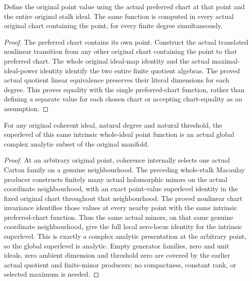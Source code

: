 \begin{theorem}
\label{hir:actual-intrinsic-whole-stalk-hilbert-samuel-value}
\leanok
{}
Define the original point value using the actual preferred chart at that
point and the entire original stalk ideal. The same function is computed
in every actual original chart containing the point, for every finite
degree simultaneously.
\end{theorem}
\begin{proof}
The preferred chart contains its own point. Construct the actual translated
nonlinear transition from any other original chart containing the point
to that preferred chart. The whole original ideal-map identity and the
actual maximal-ideal-power identity identify the two entire finite quotient
algebras. The proved actual quotient linear equivalence preserves their
literal dimensions for each degree. This proves equality with the single
preferred-chart function, rather than defining a separate value for each
chosen chart or accepting chart-equality as an assumption.
\end{proof}

\begin{theorem}
\label{hir:actual-intrinsic-hilbert-samuel-analytic-superlevels}
\leanok
{}
For any original coherent ideal, natural degree and natural threshold, the
superlevel of this same intrinsic whole-ideal point function is an actual
global complex analytic subset of the original manifold.
\end{theorem}
\begin{proof}
At an arbitrary original point, coherence internally selects one actual
Cartan family on a genuine neighbourhood. The preceding whole-stalk
Macaulay producer constructs finitely many actual holomorphic minors on the
actual coordinate neighbourhood, with an exact point-value superlevel
identity in the fixed original chart throughout that neighbourhood. The
proved nonlinear chart invariance identifies those values at every nearby
point with the same intrinsic preferred-chart function. Thus the same
actual minors, on that same genuine coordinate neighbourhood, give the
full local zero-locus identity for the intrinsic superlevel. This is exactly
a complex analytic presentation at the arbitrary point, so the global
superlevel is analytic. Empty generator families, zero and unit ideals,
zero ambient dimension and threshold zero are covered by the earlier
actual quotient and finite-minor producers; no compactness, constant rank,
or selected maximum is needed.
\end{proof}

